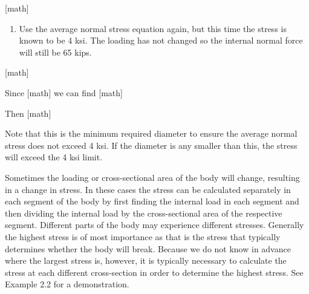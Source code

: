 \documentclass[
  letterpaper,
  DIV=11,
  numbers=noendperiod]{scrreprt}
\providecommand{\tightlist}{%
  \setlength{\itemsep}{0pt}\setlength{\parskip}{0pt}}\usepackage{longtable,booktabs,array}
\begin{document}
\begin{tcolorbox}
\begin{tcolorbox}
{[}math{]}

\begin{enumerate}
\def\labelenumi{\arabic{enumi}.}
\setcounter{enumi}{1}
\tightlist
\item
  Use the average normal stress equation again, but this time the stress
  is known to be 4 ksi. The loading has not changed so the internal
  normal force will still be 65 kips.
\end{enumerate}

{[}math{]}

Since {[}math{]} we can find {[}math{]}

Then {[}math{]}

Note that this is the minimum required diameter to ensure the average
normal stress does not exceed 4 ksi. If the diameter is any smaller than
this, the stress will exceed the 4 ksi limit.

\end{tcolorbox}

\end{tcolorbox}

Sometimes the loading or cross-sectional area of the body will change,
resulting in a change in stress. In these cases the stress can be
calculated separately in each segment of the body by first finding the
internal load in each segment and then dividing the internal load by the
cross-sectional area of the respective segment. Different parts of the
body may experience different stresses. Generally the highest stress is
of most importance as that is the stress that typically determines
whether the body will break. Because we do not know in advance where the
largest stress is, however, it is typically necessary to calculate the
stress at each different cross-section in order to determine the highest
stress. See Example 2.2 for a demonstration.
\end{document}
